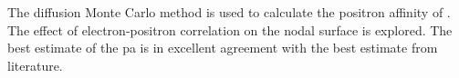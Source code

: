 The diffusion Monte Carlo method is used to calculate the positron affinity of .
The effect of electron-positron correlation on the nodal surface is explored.
The best estimate of the \gls{pa} is in excellent agreement with the best estimate from literature.
